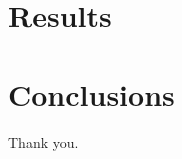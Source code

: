 \documentclass[twocolumn, times]{aastex631}
\begin{document}
\section{Results}
\label{sec:results}





\section{Conclusions}
\label{sec:conclusions}

\begin{acknowledgments}
  Thank you.
\end{acknowledgments}



\end{document}
